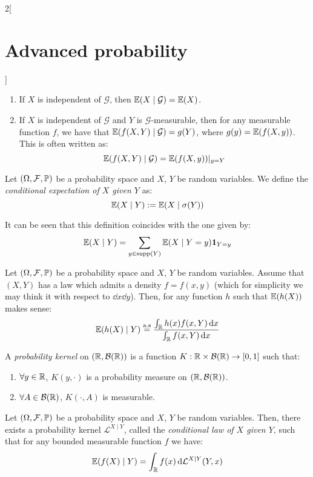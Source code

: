 \documentclass[../../../main_math.tex]{subfiles}
\begin{document}
\begin{multicols}{2}[\section{Advanced probability}]
\begin{proposition}
\begin{enumerate}
      \item If $X$ is independent of $\mathcal{G}$, then $\mathbb{E}(X\mid \mathcal{G})=\mathbb{E}(X)$.
      \item If $X$ is independent of $\mathcal{G}$ and $Y$ is $\mathcal{G}$-measurable, then for any measurable function $f$, we have that $\mathbb{E}(f(X,Y)\mid \mathcal{G})=g(Y)$, where $g(y)=\mathbb{E}(f(X,y))$. This is often written as:
            $$
              \mathbb{E}(f(X,Y)\mid \mathcal{G})=\mathbb{E}(f(X,y))|_{y=Y}
            $$
    \end{enumerate}
  \end{proposition}
  \begin{definition}
    Let $(\Omega,\mathcal{F},\mathbb{P})$ be a probability space and $X$, $Y$ be random variables. We define the \emph{conditional expectation of $X$ given $Y$} as:
    $$
      \mathbb{E}(X\mid Y):=\mathbb{E}(X\mid \sigma(Y))
    $$
  \end{definition}
  \begin{remark}
    It can be seen that this definition coincides with the one given by:
    $$
      \mathbb{E}(X\mid Y)=\sum_{y\in \operatorname{supp}(Y)} \mathbb{E}(X\mid Y=y)\boldsymbol{\mathrm{1}}_{Y=y}
    $$
  \end{remark}
  \begin{proposition}
    Let $(\Omega,\mathcal{F},\mathbb{P})$ be a probability space and $X$, $Y$ be random variables. Assume that $(X,Y)$ has a law which admits a density $f=f(x,y)$ (which for simplicity we may think it with respect to $\dd{x}\dd{y}$). Then, for any function $h$ such that $\mathbb{E}(h(X))$ makes sense:
    $$
      \mathbb{E}(h(X)\mid Y)\overset{\text{a.s}}{=}\frac{\int_{\mathbb{R}}{h(x)f(x,Y)\dd{x}}}{\int_{\mathbb{R}}{f(x,Y)\dd{x}}}
    $$
  \end{proposition}
  \begin{definition}
    A \emph{probability kernel} on $(\mathbb{R}, \mathcal{B}(\mathbb{R}))$ is a function $K:\mathbb{R}\times \mathcal{B}(\mathbb{R})\to [0,1]$ such that:
    \begin{enumerate}
      \item $\forall y\in \mathbb{R}$, $K(y,\cdot)$ is a probability measure on $(\mathbb{R},\mathcal{B}(\mathbb{R}))$.
      \item $\forall A\in \mathcal{B}(\mathbb{R})$, $K(\cdot,A)$ is measurable.
    \end{enumerate}
  \end{definition}
  \begin{theorem}
    Let $(\Omega,\mathcal{F},\mathbb{P})$ be a probability space and $X$, $Y$ be random variables. Then, there exists a probability kernel $\mathcal{L}^{X\mid Y}$, called the \emph{conditional law of $X$ given $Y$}, such that for any bounded measurable function $f$ we have:
    $$
      \mathbb{E}(f(X)\mid Y)=\int_{\mathbb{R}}{f(x)\dd{\mathcal{L}^{X\mid Y}(Y,x)}}
    $$
  \end{theorem}
\end{multicols}
\end{document}
